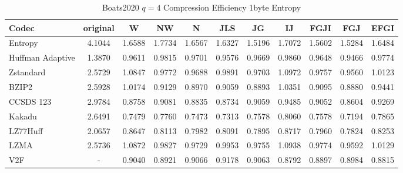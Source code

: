 \documentclass{article}
\begin{document}
\begin{table}[h!]
\centering
\caption{Boats2020 $q=4$ Compression Efficiency 1byte Entropy}
\begin{tabular}{|l|cccccccccc|}
\hline
Codec &  original &      W &     NW &      N &    JLS &     JG &     IJ &   FGJI &    FGJ &   EFGI \\
\hline
Entropy & 4.1044 & 1.6588 & 1.7734 & 1.6567 & 1.6327 & 1.5196 & 1.7072 & 1.5602 & 1.5284 & 1.6484 \\
\hline
Huffman Adaptive &    1.3870 & 0.9611 & 0.9815 & 0.9701 & 0.9576 & 0.9669 & 0.9860 & 0.9648 & 0.9466 & 0.9774 \\
Zstandard        &    2.5729 & 1.0847 & 0.9772 & 0.9688 & 0.9891 & 0.9703 & 1.0972 & 0.9757 & 0.9560 & 1.0123 \\
BZIP2            &    2.5928 & 1.0174 & 0.9129 & 0.8970 & 0.9059 & 0.8893 & 1.0351 & 0.9095 & 0.8880 & 0.9441 \\
CCSDS 123        &    2.9784 & 0.8758 & 0.9081 & 0.8835 & 0.8734 & 0.9059 & 0.9485 & 0.9052 & 0.8604 & 0.9269 \\
Kakadu           &    2.6491 & 0.7479 & 0.7760 & 0.7473 & 0.7313 & 0.7578 & 0.8060 & 0.7578 & 0.7194 & 0.7865 \\
LZ77Huff         &    2.0657 & 0.8647 & 0.8113 & 0.7982 & 0.8091 & 0.7895 & 0.8717 & 0.7960 & 0.7824 & 0.8253 \\
LZMA             &    2.5736 & 1.0872 & 0.9827 & 0.9729 & 0.9953 & 0.9755 & 1.0938 & 0.9774 & 0.9592 & 1.0129 \\
V2F              &    - & 0.9040 & 0.8921 & 0.9066 & 0.9178 & 0.9063 & 0.8792 & 0.8897 & 0.8984 & 0.8815 \\
\hline
\end{tabular}
\end{table}
\end{document}
